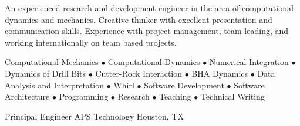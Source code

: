 \documentclass{resume}
\begin{document}
	\thispagestyle{lefooterhorizontalline}
	\makeresumeheaderB

	An experienced research and development engineer in the area of computational dynamics and mechanics. Creative thinker with excellent presentation and communication skills. Experience with project management, team leading, and working internationally on team based projects.

	Computational Mechanics $\bullet$ Computational Dynamics $\bullet$ Numerical Integration $\bullet$ Dynamics of Drill Bits $\bullet$ Cutter-Rock Interaction $\bullet$ BHA Dynamics $\bullet$ Data Analysis and Interpretation $\bullet$ Whirl $\bullet$ Software Development $\bullet$ Software Architecture $\bullet$ Programming $\bullet$ Research $\bullet$ Teaching $\bullet$ Technical Writing

    
            {Principal Engineer}
            {APS Technology}
			{Houston, TX}
			
\end{document}
